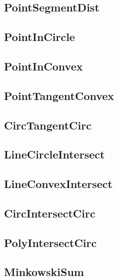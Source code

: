 	\subsection{PointSegmentDist}
	
	\subsection{PointInCircle}
	
	\subsection{PointInConvex}
	
	\subsection{PointTangentConvex}
	
	\subsection{CircTangentCirc}
	
	\subsection{LineCircleIntersect}
	
	\subsection{LineConvexIntersect}
	
	\subsection{CircIntersectCirc}
	
	\subsection{PolyIntersectCirc}
	
	\subsection{MinkowskiSum}
	
